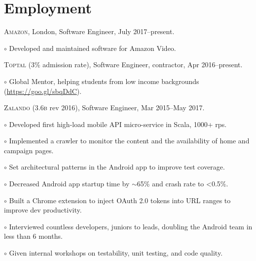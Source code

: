 \documentclass[letterpaper]{article}
\renewenvironment{itemize}{
  \begin{list}{}{
    \setlength{\leftmargin}{1.5em}
  }
}{
  \end{list}
}
\newenvironment{no-indent-itemize}{
  \begin{list}{}{
    \setlength{\leftmargin}{0em}
  }
}{
  \end{list}
}
\def\tilde{$\scriptstyle\sim$}
\def\bullet{$\circ$\xspace}
\begin{document}
\section*{Employment}
\begin{no-indent-itemize}
  \item \textsc{Amazon}, London, Software Engineer, July 2017--present.
  \begin{itemize}
    \item\bullet Developed and maintained software for Amazon Video.
  \end{itemize}
  \item \textsc{Toptal} (3\% admission rate), Software Engineer, contractor, Apr 2016--present.
  \begin{itemize}
    \item\bullet Global Mentor, helping students from low income backgrounds (\href{https://goo.gl/sbqDdC}{https://goo.gl/sbqDdC}).
  \end{itemize}
  \item \textsc{Zalando} (3.6\textsc{b} rev 2016), Software Engineer, Mar 2015--May 2017.
  \begin{itemize}
    \item\bullet Developed first high-load mobile API micro-service in Scala, 1000+ rps.
    \item\bullet Implemented a crawler to monitor the content and the availability of home and campaign pages.
    \item\bullet Set architectural patterns in the Android app to improve test coverage.
    \item\bullet Decreased Android app startup time by \tilde 65\% and crash rate to <0.5\%.
    \item\bullet Built a Chrome extension to inject OAuth 2.0 tokens into URL ranges to improve dev productivity.
    \item\bullet Interviewed countless developers, juniors to leads, doubling the Android team in less than 6 months.
    \item\bullet Given internal workshops on testability, unit testing, and code quality.

\end{itemize}
\end{no-indent-itemize}
\end{document}
